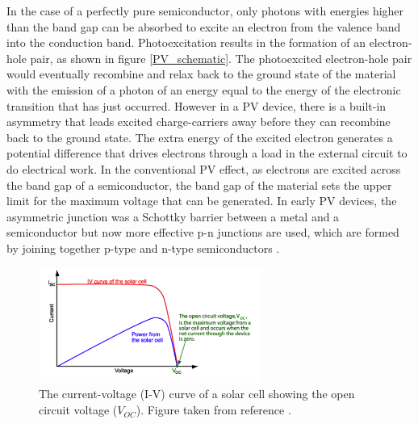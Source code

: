 In the case of a perfectly pure semiconductor, only photons with energies higher than the band gap can be absorbed to excite an electron from the valence band into the conduction band.
Photoexcitation results in the formation of an electron-hole pair, as shown in figure \ref{PV_schematic}. The photoexcited electron-hole pair would eventually recombine and relax back 
to the ground state of the material with the emission of a photon of an energy equal to the energy of the 
electronic transition that has just occurred. 
However in a PV device, there is a built-in asymmetry that leads excited charge-carriers away before they can recombine back to the ground state. The extra energy of the excited electron generates a potential difference that drives electrons through a load in the external circuit to 
do electrical work. In the conventional PV effect, as electrons are excited across the band gap of a semiconductor, the band gap of the material sets the upper limit for the maximum voltage that can be generated. In early PV devices, the asymmetric junction was a Schottky barrier between a metal and a 
semiconductor but now more effective p-n junctions are used, which are formed by joining together p-type and n-type semiconductors \cite{Nelson1}. 

\begin{figure}[h!]
  \centering
    \includegraphics[width=0.65\textwidth]{figures/IV}
    \caption{The current-voltage (I-V) curve of a solar cell showing the open circuit voltage ($V_{OC}$). Figure taken from reference .}
  \label{IV}
\end{figure}

